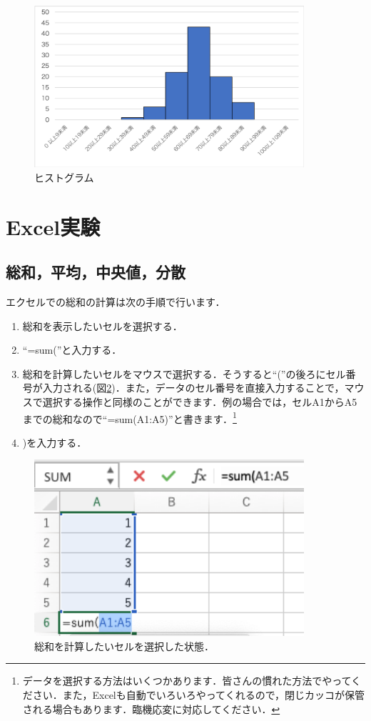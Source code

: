 \documentclass[12pt, a4j]{jsreport}
\begin{document}
\begin{figure}[tb]
    \centering
  \includegraphics[width=10cm]{hist.png}
  \caption{ヒストグラム}
  \label{fig:histogram}
\end{figure}

\clearpage

\section{Excel実験}

\subsection{総和，平均，中央値，分散}

エクセルでの総和の計算は次の手順で行います．

\begin{enumerate}
    \item 総和を表示したいセルを選択する．
    \item ``=sum(''と入力する．
    \item 総和を計算したいセルをマウスで選択する．そうすると``(''の後ろにセル番号が入力される(図\ref{fig:sum})．また，データのセル番号を直接入力することで，マウスで選択する操作と同様のことができます．例の場合では，セルA1からA5までの総和なので``=sum(A1:A5)''と書きます．\footnote{データを選択する方法はいくつかあります．皆さんの慣れた方法でやってください．また，Excelも自動でいろいろやってくれるので，閉じカッコが保管される場合もあります．臨機応変に対応してください．}
    \item )を入力する．
\end{enumerate}

\begin{figure}[htbp]
  \includegraphics[width=10cm]{sum.png}
  \caption{総和を計算したいセルを選択した状態．}
  \label{fig:sum}
\end{figure}
\end{document}
